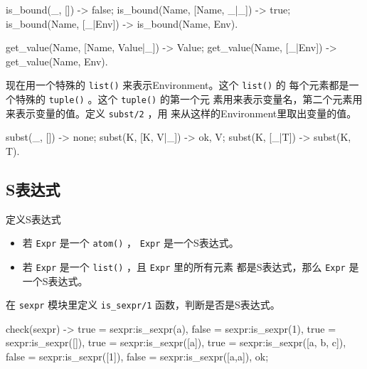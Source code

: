 \documentclass[preview,multi,crop=false,border=1in,class=memoir]{standalone}
\begin{document}
\begin{preview-page}
\begin{Answer}
\begin{SourceCode}
is_bound(_, []) ->
    false;
is_bound(Name, [{Name, _}|_]) ->
    true;
is_bound(Name, [_|Env]) ->
    is_bound(Name, Env).

get_value(Name, [{Name, Value}|_]) ->
    Value;
get_value(Name, [_|Env]) ->
    get_value(Name, Env).
\end{SourceCode}
\end{Answer}

\nonzeroparskip

现在用一个特殊的 \verb|list()| 来表示Environment。这个 \verb|list()| 的
每个元素都是一个特殊的 \verb|tuple()| 。这个 \verb|tuple()| 的第一个元
素用来表示变量名，第二个元素用来表示变量的值。定义 \verb|subst/2| ，用
来从这样的Environment里取出变量的值。

\begin{SourceCode}
subst(_, []) ->
    none;
subst(K, [{K, V}|_]) ->
    {ok, V};
subst(K, [_|T]) ->
    subst(K, T).
\end{SourceCode}


\subsection{S表达式}

定义S表达式 \cite{McCarthy:1960:symbolic}

\begin{itemize}
\item 若 \verb|Expr| 是一个 \verb|atom()| ， \verb|Expr| 是一个S表达式。
\item 若 \verb|Expr| 是一个 \verb|list()| ，且 \verb|Expr| 里的所有元素
都是S表达式，那么 \verb|Expr| 是一个S表达式。
\end{itemize}

\begin{Exercise}[title={sexpr},difficulty=1]
在 \verb|sexpr| 模块里定义 \verb|is_sexpr/1| 函数，判断是否是S表达式。

\begin{SourceCode}
check(sexpr) ->
    true = sexpr:is_sexpr(a),
    false = sexpr:is_sexpr(1),
    true = sexpr:is_sexpr([]),
    true = sexpr:is_sexpr([a]),
    true = sexpr:is_sexpr([a, b, c]),
    false = sexpr:is_sexpr([1]),
    false = sexpr:is_sexpr([{a,a}]),
    ok;
\end{SourceCode}
\end{Exercise}

\begin{Answer}


\end{Answer}
\end{preview-page}
\end{document}
